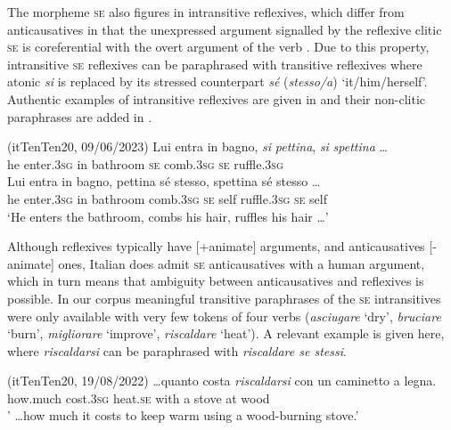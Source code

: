 \documentclass[output=paper,colorlinks,citecolor=brown
]{langscibook}
\begin{document}
The morpheme \textsc{se} also figures in intransitive reflexives, which differ from anticausatives in that the unexpressed argument signalled by the reflexive clitic \textsc{se} is coreferential with the overt argument of the verb \citep[257, 126—136]{vanvalin1990semantic,bentley2006split}. Due to this property, intransitive \textsc{se} reflexives can be paraphrased with transitive reflexives where atonic \textit{si} is replaced by its stressed counterpart \textit{sé} (\textit{stesso/a}) ‘it/him/herself’. Authentic examples of intransitive reflexives are given in  and their non-clitic paraphrases are added in .


\hspace*{\fill}(itTenTen20, 09/06/2023)\quad
\ea \label{bentley_example_4}
    \ea \label{bentley_example_4a}
    \gll Lui entra in bagno, \textit{si} \textit{pettina}, \textit{si} \textit{spettina} \ldots  \\
    he enter.3\textsc{sg} in bathroom \textsc{se} comb.3\textsc{sg} \textsc{se} ruffle.3\textsc{sg} \\
    \ex \label{bentley_example_4b}
    \gll Lui entra in bagno, pettina sé stesso, spettina sé stesso \ldots  \\
    he enter.3\textsc{sg} in bathroom comb.3\textsc{sg} \textsc{se} self ruffle.3\textsc{sg} \textsc{se} self  \\
    \glt ‘He enters the bathroom, combs his hair, ruffles his hair  \ldots ’  \\
    \z
\z

Although reflexives typically have [+animate] arguments, and anticausatives [-animate] ones, Italian does admit \textsc{se} anticausatives with a human argument, which in turn means that ambiguity between anticausatives and reflexives is possible. In our corpus meaningful transitive paraphrases of the \textsc{se} intransitives were only available with very few tokens of four verbs (\textit{asciugare} ‘dry’, \textit{bruciare} ‘burn’, \textit{migliorare} ‘improve’, \textit{riscaldare} ‘heat’). A relevant example is given here, where \textit{riscaldarsi} can be paraphrased with \textit{riscaldare se stessi}.

\hspace*{\fill}(itTenTen20, 19/08/2022)\quad
\ea \label{bentley_example_5}
\gll  \ldots  quanto costa \textit{riscaldarsi} con un caminetto a legna. \\
    how.much	cost.3\textsc{sg} heat.\textsc{se} with a stove at wood \\
\glt ' \ldots  how much it costs to keep warm using a wood-burning stove.’
\z
\end{document}
